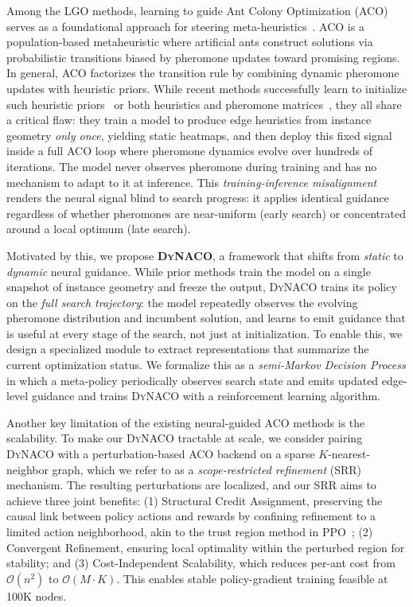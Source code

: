 \documentclass[sigconf]{acmart}
\newcommand{\DyNACO}{\textsc{DyNACO}}
\begin{document}
Among the LGO methods, learning to guide Ant Colony Optimization (ACO)~\cite{ACO, maxmin} serves as a foundational approach for steering meta-heuristics~\cite{deepaco,gtgaco}. ACO is a population-based metaheuristic where artificial ants construct solutions via probabilistic transitions biased by pheromone updates toward promising regions. In general, ACO factorizes the transition rule by combining dynamic pheromone updates with heuristic priors. While recent methods successfully learn to initialize such heuristic priors~\cite{deepaco,gfacs} or both heuristics and pheromone matrices~\cite{gtgaco}, they all share a critical flaw: they train a model to produce edge heuristics from instance geometry \emph{only once}, yielding static heatmaps, and then deploy this fixed signal inside a full ACO loop where pheromone dynamics evolve over hundreds of iterations.
The model never observes pheromone during training and has no mechanism to adapt to it at inference.
This \emph{training-inference misalignment} renders the neural signal blind to search progress: it applies identical guidance regardless of whether pheromones are near-uniform (early search) or concentrated around a local optimum (late search).

Motivated by this, we propose \textbf{\DyNACO{}}, a framework that shifts from \emph{static} to \emph{dynamic} neural guidance. While prior methods train the model on a single snapshot of instance geometry and freeze the output, \DyNACO{} trains its policy on the \emph{full search trajectory}: the model repeatedly observes the evolving pheromone distribution and incumbent solution, and learns to emit guidance that is useful at every stage of the search, not just at initialization. To enable this, we design a specialized module to extract representations that summarize the current optimization status. 
We formalize this as a \emph{semi-Markov Decision Process} in which a meta-policy periodically observes search state and emits updated edge-level guidance and trains \DyNACO{}  with a reinforcement learning algorithm.

Another key limitation of the existing neural-guided ACO methods is the scalability.
To make our \DyNACO{} tractable at scale, we consider pairing \DyNACO{} with a perturbation-based ACO backend on a sparse $K$-nearest-neighbor graph, which we refer to as a \emph{scope-restricted refinement} (SRR) mechanism.
The resulting perturbations are localized, and our SRR aims to achieve three joint benefits: (1) Structural Credit Assignment, preserving the causal link between policy actions and rewards by confining refinement to a limited action neighborhood, akin to the trust region method in PPO~\cite{PPO}; (2) Convergent Refinement, ensuring local optimality within the perturbed region for stability; and (3) Cost-Independent Scalability, which reduces per-ant cost from $\mathcal{O}(n^2)$ to $\mathcal{O}(M \cdot K)$. This enables stable policy-gradient training feasible at 100K nodes.
\end{document}
